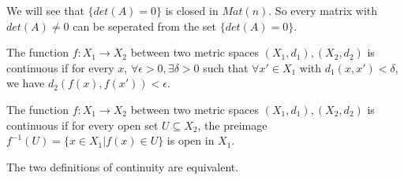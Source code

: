 \documentclass[main.tex]{subfiles}
\begin{document}
\begin{example}
    We will see that $\{det(A) = 0\}$ is closed in $Mat(n)$. So every matrix with $det(A) \neq 0$ can be seperated from the set $\{det(A)  = 0\}$.
\end{example}
\begin{definition}
    The function $f: X_1 \rightarrow X_2$ between two metric spaces $(X_1, d_1), (X_2, d_2)$ is continuous if for every $x$, $\forall \epsilon > 0, \exists \delta > 0$ such that $\forall x' \in X_1$ with $d_1 (x, x') < \delta$, we have $d_2 (f(x), f(x')) < \epsilon$. 
\end{definition}
\begin{definition}
    The function $f: X_1 \rightarrow X_2$ between two metric spaces $(X_1, d_1), (X_2, d_2)$ is continuous if for every open set $U \subseteq X_2$, the preimage $f^{-1} (U) = \{x \in X_1 | f(x) \in U\}$ is open in $X_1$.
\end{definition}
\begin{theorem}
    The two definitions of continuity are equivalent.
\end{theorem}
\end{document}
